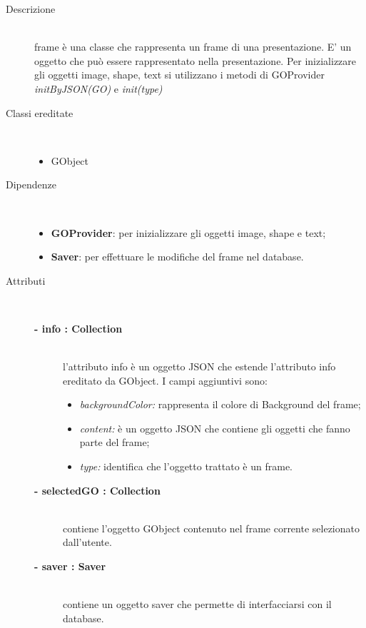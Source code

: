 \begin{description}
\item[Descrizione] \hfill \\
	frame è una classe che rappresenta un frame di una presentazione. E' un oggetto che può essere rappresentato nella presentazione. Per inizializzare gli oggetti image, shape, text si utilizzano i metodi di GOProvider \textit{initByJSON(GO)} e \textit{init(type)}
	
\item[Classi ereditate] \hfill \\
	\begin{itemize}
		\item GObject
	\end{itemize}

\item[Dipendenze] \hfill \\
	\begin{itemize}
		\item \textbf{GOProvider}: per inizializzare gli oggetti image, shape e text;
		\item \textbf{Saver}: per effettuare le modifiche del frame nel database.
	\end{itemize}

\item[Attributi] \hfill \\
	\begin{description}
		\item[\textbf{- info : Collection			}] \hfill \\
			l'attributo info è un oggetto JSON che estende l'attributo info ereditato da GObject. I campi aggiuntivi sono:
	\begin{itemize}
		\item \textit{backgroundColor:} rappresenta il colore di Background del frame;
		\item \textit{content:} è un oggetto JSON che contiene gli oggetti che fanno parte del frame;
		\item \textit{type:} identifica che l'oggetto trattato è un frame.
	\end{itemize}
	\end{description}
	\begin{description}
		\item[\textbf{- selectedGO : Collection			}] \hfill \\
			contiene l'oggetto GObject contenuto nel frame corrente selezionato dall'utente.  
	\end{description}
	\begin{description}
		\item[\textbf{- saver : Saver			}] \hfill \\
			contiene un oggetto saver che permette di interfacciarsi con il database.  
	\end{description}
	

\end{description}

